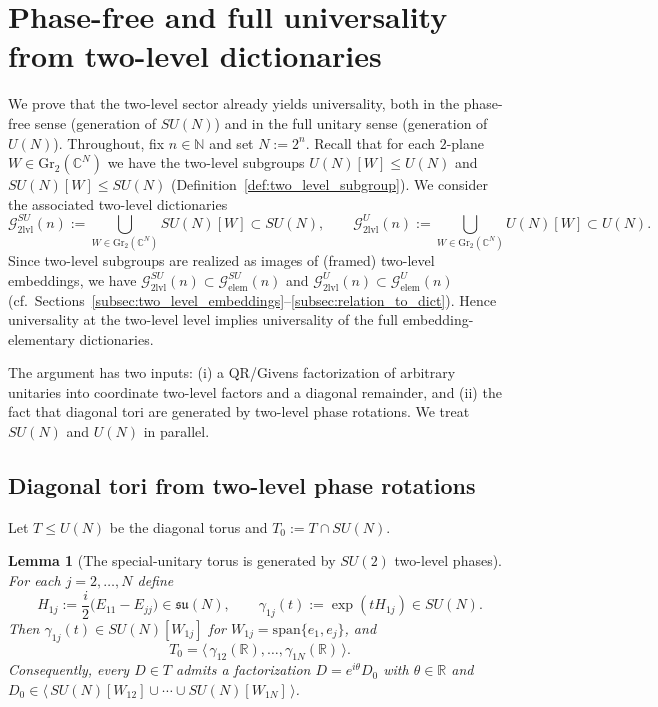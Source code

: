 \documentclass{article}%
\newtheorem{lemma}[theorem]{Lemma}
\theoremstyle{definition}
\numberwithin{equation}{section}
\newcommand{\R}{\mathbb{R}}
\newcommand{\N}{\mathbb{N}}
\newcommand{\C}{\mathbb{C}}
\newcommand{\Gr}{\mathrm{Gr}}
\begin{document}
\section{Phase-free and full universality from two-level dictionaries}
\label{sec:universality}

\noindent
We prove that the two-level sector already yields universality, both in the phase-free sense (generation of $SU(N)$) and in the full
unitary sense (generation of $U(N)$). Throughout, fix $n\in\N$ and set $N:=2^n$. Recall that for each $2$-plane
$W\in\Gr_2(\C^N)$ we have the two-level subgroups $U(N)[W]\le U(N)$ and $SU(N)[W]\le SU(N)$
(Definition~\ref{def:two_level_subgroup}). We consider the associated two-level dictionaries
\begin{equation}\label{eq:G2lvl_def_SU_U_concise}
\mathcal{G}^{SU}_{\mathrm{2lvl}}(n):=\bigcup_{W\in\Gr_2(\C^N)} SU(N)[W]\subset SU(N),
\qquad
\mathcal{G}^{U}_{\mathrm{2lvl}}(n):=\bigcup_{W\in\Gr_2(\C^N)} U(N)[W]\subset U(N).
\end{equation}
Since two-level subgroups are realized as images of (framed) two-level embeddings, we have
$\mathcal{G}^{SU}_{\mathrm{2lvl}}(n)\subset \mathcal{G}^{SU}_{\mathrm{elem}}(n)$ and
$\mathcal{G}^{U}_{\mathrm{2lvl}}(n)\subset \mathcal{G}^{U}_{\mathrm{elem}}(n)$
(cf.\ Sections~\ref{subsec:two_level_embeddings}--\ref{subsec:relation_to_dict}). Hence universality at the two-level level implies
universality of the full embedding-elementary dictionaries.

\medskip
\noindent
The argument has two inputs: (i) a QR/Givens factorization of arbitrary unitaries into coordinate two-level factors and a diagonal
remainder, and (ii) the fact that diagonal tori are generated by two-level phase rotations. We treat $SU(N)$ and $U(N)$ in parallel.

\subsection{Diagonal tori from two-level phase rotations}
\label{subsec:diagonal_tori_two_level}

Let $T\le U(N)$ be the diagonal torus and $T_0:=T\cap SU(N)$.

\begin{lemma}[The special-unitary torus is generated by $SU(2)$ two-level phases]
\label{lem:T0_generated_by_two_level_phases_concise}
For each $j=2,\dots,N$ define
\[
H_{1j}:=\frac{i}{2}\big(E_{11}-E_{jj}\big)\in\mathfrak{su}(N),
\qquad
\gamma_{1j}(t):=\exp(tH_{1j})\in SU(N).
\]
Then $\gamma_{1j}(t)\in SU(N)[W_{1j}]$ for $W_{1j}=\mathrm{span}\{e_1,e_j\}$, and
\[
T_0=\Big\langle\,\gamma_{12}(\R),\dots,\gamma_{1N}(\R)\,\Big\rangle.
\]
Consequently, every $D\in T$ admits a factorization $D=e^{i\theta}D_0$ with $\theta\in\R$ and
$D_0\in\big\langle\,SU(N)[W_{12}]\allowbreak\cup\cdots\allowbreak\cup SU(N)[W_{1N}]\,\big\rangle$.
\end{lemma}
\end{document}
